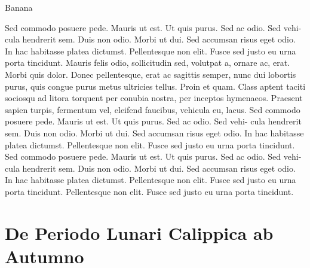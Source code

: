 \documentclass[12pt,twoside,a4paper]{book}
\begin{document}
%
%  

Banana
\clearpage
\lipsum

Sed commodo posuere pede. Mauris ut est. Ut quis purus. Sed ac odio.
Sed vehi- cula hendrerit sem. Duis non odio. Morbi ut dui.
Sed accumsan risus eget odio. In hac habitasse platea dictumst.
Pellentesque non elit. Fusce sed justo eu urna porta tincidunt.
Mauris felis odio, sollicitudin sed, volutpat a, ornare ac, erat.
Morbi quis dolor. Donec pellentesque, erat ac sagittis semper,
nunc dui lobortis purus, quis congue purus metus ultricies tellus.
Proin et quam. Class aptent taciti sociosqu ad litora torquent per
conubia nostra, per inceptos hymenaeos.
Praesent sapien turpis, fermentum vel, eleifend faucibus, vehicula eu,
lacus.
Sed commodo posuere pede. Mauris ut est. Ut quis purus. Sed ac odio.
Sed vehi- cula hendrerit sem. Duis non odio. Morbi ut dui.
Sed accumsan risus eget odio. In hac habitasse platea dictumst.
Pellentesque non elit. Fusce sed justo eu urna porta tincidunt.
Sed commodo posuere pede. Mauris ut est. Ut quis purus. Sed ac odio.
Sed vehi- cula hendrerit sem. Duis non odio. Morbi ut dui.
Sed accumsan risus eget odio. In hac habitasse platea dictumst.
Pellentesque non elit. Fusce sed justo eu urna porta tincidunt.
Pellentesque non elit. Fusce sed justo eu urna porta tincidunt.



\section{De Periodo Lunari Calippica ab Autumno}

\lipsum

\lipsum[150]

\listoftables
\end{document}
